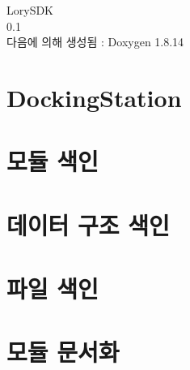 \documentclass[twoside]{book}
\newcommand{\+}{\discretionary{\mbox{\scriptsize$\hookleftarrow$}}{}{}}
\newcommand{\clearemptydoublepage}{%
  \newpage{\pagestyle{empty}\cleardoublepage}%
}
\begin{document}
\hypersetup{pageanchor=false,
             bookmarksnumbered=true,
             pdfencoding=unicode
            }
\begin{titlepage}
\vspace*{7cm}
\begin{center}%
{\Large Lory\+S\+DK \\[1ex]\large 0.\+1 }\\
\vspace*{1cm}
{\large 다음에 의해 생성됨 \+:  Doxygen 1.8.14}\\
\end{center}
\end{titlepage}
\clearemptydoublepage
{}
\tableofcontents
\clearemptydoublepage
{}
\hypersetup{pageanchor=true}

\chapter{Docking\+Station}
\label{index}\hypertarget{index}{}
\chapter{모듈 색인}

\chapter{데이터 구조 색인}

\chapter{파일 색인}

\chapter{모듈 문서화}











\end{document}
